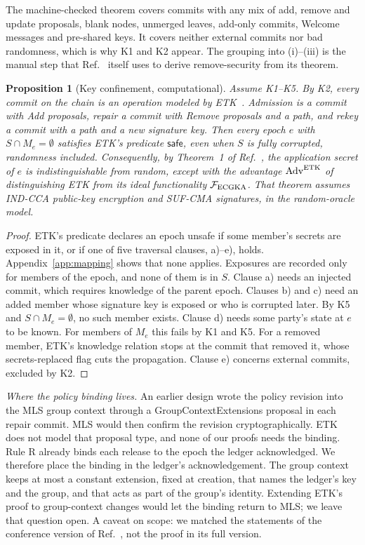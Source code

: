 \documentclass[aps,prx,reprint,superscriptaddress,nofootinbib,floatfix]{revtex4-2}
\newtheorem{proposition}{Proposition}
\theoremstyle{remark}
\newcommand{\roster}{M}
\newcommand{\Adv}{\mathrm{Adv}}
\begin{document}
The machine-checked theorem covers commits with any mix of add, remove and update proposals, blank nodes, unmerged leaves, add-only commits, Welcome messages and pre-shared keys. It covers neither external commits nor bad randomness, which is why K1 and K2 appear. The grouping into (i)--(iii) is the manual step that Ref.~\cite{wallez-thesis} itself uses to derive remove-security from its theorem.

\begin{proposition}[Key confinement, computational]\label{prop:Kcomp}
Assume K1--K5. By K2, every commit on the chain is an operation modeled by ETK~\cite{etk}. Admission is a commit with Add proposals, repair a commit with Remove proposals and a path, and rekey a commit with a path and a new signature key. Then every epoch $e$ with $S\cap\roster_e=\emptyset$ satisfies ETK's predicate $\mathsf{safe}$, even when $S$ is fully corrupted, randomness included. Consequently, by Theorem~1 of Ref.~\cite{etk}, the application secret of $e$ is indistinguishable from random, except with the advantage $\Adv^{\rm ETK}$ of distinguishing ETK from its ideal functionality $\mathcal F_{\rm ECGKA}$. That theorem assumes IND-CCA public-key encryption and SUF-CMA signatures, in the random-oracle model.
\end{proposition}
\begin{proof}
ETK's predicate declares an epoch unsafe if some member's secrets are exposed in it, or if one of five traversal clauses, a)--e), holds. Appendix~\ref{app:mapping} shows that none applies. Exposures are recorded only for members of the epoch, and none of them is in $S$. Clause a) needs an injected commit, which requires knowledge of the parent epoch. Clauses b) and c) need an added member whose signature key is exposed or who is corrupted later. By K5 and $S\cap\roster_e=\emptyset$, no such member exists. Clause d) needs some party's state at $e$ to be known. For members of $\roster_e$ this fails by K1 and K5. For a removed member, ETK's knowledge relation stops at the commit that removed it, whose \textsf{secrets-replaced} flag cuts the propagation. Clause e) concerns external commits, excluded by K2.
\end{proof}

\emph{Where the policy binding lives.} An earlier design wrote the policy revision into the MLS group context through a GroupContextExtensions proposal in each repair commit. MLS would then confirm the revision cryptographically. ETK does not model that proposal type, and none of our proofs needs the binding. Rule R already binds each release to the epoch the ledger acknowledged. We therefore place the binding in the ledger's acknowledgement. The group context keeps at most a constant extension, fixed at creation, that names the ledger's key and the group, and that acts as part of the group's identity. Extending ETK's proof to group-context changes would let the binding return to MLS; we leave that question open. A caveat on scope: we matched the statements of the conference version of Ref.~\cite{etk}, not the proof in its full version.
\end{document}
